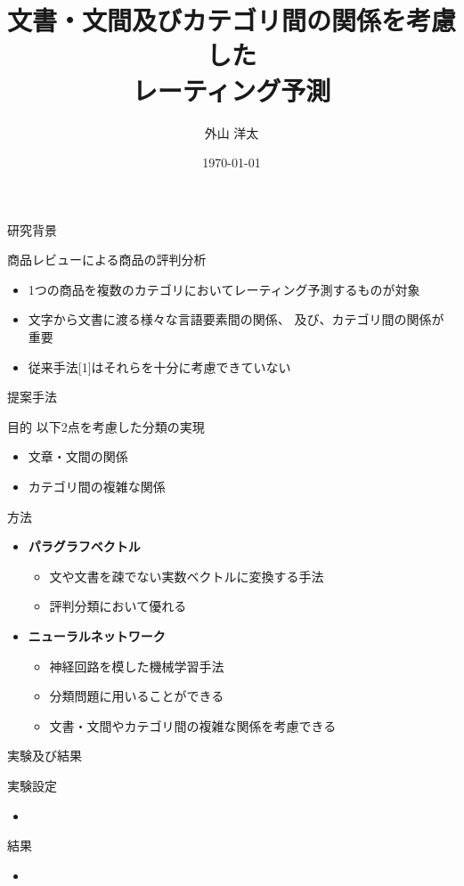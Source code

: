 \documentclass[aspectratio=43,unicode,10pt]{beamer}
\title{文書・文間及びカテゴリ間の関係を考慮した\\レーティング予測}
\institute{豊田工業大学 知能数理研究室}
\author{外山 洋太}
\date{\today}
\newcommand{\itemtitle}[1]{\textbf{#1}\\}
\begin{document}
\begin{frame}
\titlepage
\end{frame}

\begin{frame}{研究背景}{}
  \begin{block}{商品レビューによる商品の評判分析}
    \begin{itemize}
      \item 1つの商品を複数のカテゴリにおいてレーティング予測するものが対象
      \item 文字から文書に渡る様々な言語要素間の関係、
            及び、カテゴリ間の関係が重要
      \item 従来手法[1]はそれらを十分に考慮できていない
    \end{itemize}
  \end{block}
\end{frame}

\begin{frame}{提案手法}{}
  \begin{block}{目的}
    以下2点を考慮した分類の実現
    \begin{itemize}
      \item 文章・文間の関係
      \item カテゴリ間の複雑な関係
    \end{itemize}
  \end{block}
  \begin{block}{方法}
    \begin{itemize}
      \item \itemtitle{パラグラフベクトル}
        \begin{itemize}
          \item 文や文書を疎でない実数ベクトルに変換する手法
          \item 評判分類において優れる
        \end{itemize}
      \item \itemtitle{ニューラルネットワーク}
        \begin{itemize}
          \item 神経回路を模した機械学習手法
          \item 分類問題に用いることができる
          \item 文書・文間やカテゴリ間の複雑な関係を考慮できる
        \end{itemize}
    \end{itemize}
  \end{block}
\end{frame}

\begin{frame}{実験及び結果}{}
  \begin{block}{実験設定}
    \begin{itemize}
      \item
    \end{itemize}
  \end{block}
  \begin{block}{結果}
    \begin{itemize}
      \item
    \end{itemize}
  \end{block}
\end{frame}
\end{document}
